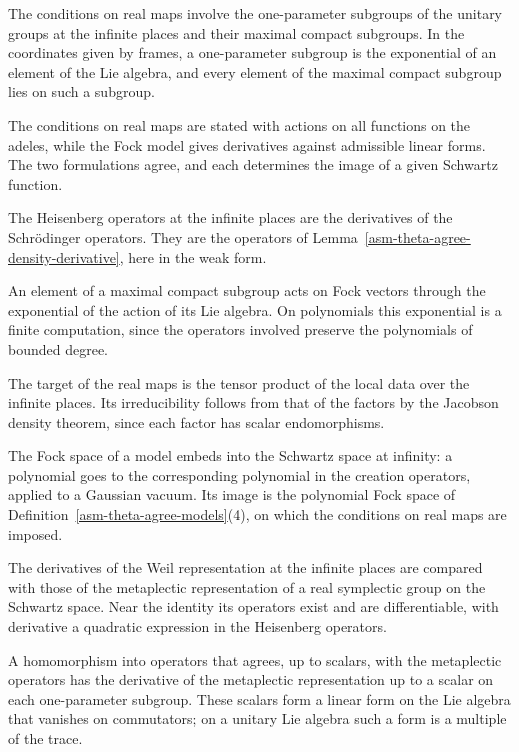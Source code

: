 The conditions on real maps involve the one-parameter subgroups of the unitary
groups at the infinite places and their maximal compact subgroups. In the
coordinates given by frames, a one-parameter subgroup is the exponential of an
element of the Lie algebra, and every element of the maximal compact subgroup
lies on such a subgroup.

The conditions on real maps are stated with actions on all functions on the
adeles, while the Fock model gives derivatives against admissible linear forms.
The two formulations agree, and each determines the image of a given Schwartz
function.

The Heisenberg operators at the infinite places are the derivatives of the
Schrödinger operators. They are the operators of
Lemma~\ref{asm-theta-agree-density-derivative}, here in the weak form.

An element of a maximal compact subgroup acts on Fock vectors through the
exponential of the action of its Lie algebra. On polynomials this exponential
is a finite computation, since the operators involved preserve the polynomials
of bounded degree.

The target of the real maps is the tensor product of the local data over the
infinite places. Its irreducibility follows from that of the factors by the
Jacobson density theorem, since each factor has scalar endomorphisms.

The Fock space of a model embeds into the Schwartz space at infinity: a
polynomial goes to the corresponding polynomial in the creation operators,
applied to a Gaussian vacuum. Its image is the polynomial Fock space of
Definition~\ref{asm-theta-agree-models}(4), on which the conditions on real
maps are imposed.

The derivatives of the Weil representation at the infinite places are compared
with those of the metaplectic representation of a real symplectic group on the
Schwartz space. Near the identity its operators exist and are differentiable,
with derivative a quadratic expression in the Heisenberg operators.

A homomorphism into operators that agrees, up to scalars, with the metaplectic
operators has the derivative of the metaplectic representation up to a scalar
on each one-parameter subgroup. These scalars form a linear form on the Lie
algebra that vanishes on commutators; on a unitary Lie algebra such a form is a
multiple of the trace.

